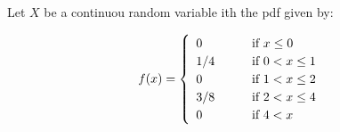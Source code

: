 


\renewcommand\assignment{Worksheet 13, Due February 17, 4:15pm}


    \iffalse
    \begin{equation*}
        \begin{gathered}
            Equations go here.
        \end{gathered}
    \end{equation*}

    \resizebox{\hsize}{!}{$Long equation goes here$}

    \begin{multicol*}{# of columns}
    \end{multicol*}

    \horizontal

    \fi


    Let $X$ be a continuou random variable ith the pdf given by:

    \begin{equation*}
        f(x) = 
        \left\{
            {\def\arraystretch{1.2}
            \begin{array}{lll}
            0   & \quad & \text{if } x \leq 0       \\
            1/4 & \quad & \text{if } 0 < x \leq 1   \\
            0   & \quad & \text{if } 1 < x \leq 2   \\
            3/8 & \quad & \text{if } 2 < x \leq 4   \\
            0   & \quad & \text{if } 4 < x  
        \end{array}}
        \right.
    \end{equation*}

